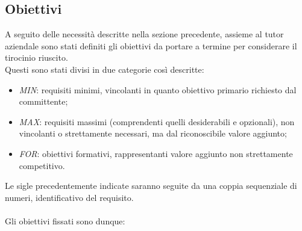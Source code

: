 \subsection{Obiettivi}
\label{subsec:obiettivi}
A seguito delle necessità descritte nella sezione precedente, assieme al tutor aziendale sono stati definiti gli obiettivi da portare a termine per considerare il tirocinio riuscito. \\
Questi sono stati divisi in due categorie così descritte:
\begin{itemize}
	\item \textit{MIN}: requisiti minimi, vincolanti in quanto obiettivo primario richiesto dal committente;
	\item \textit{MAX}: requisiti massimi (comprendenti quelli desiderabili e opzionali), non vincolanti o strettamente necessari, ma dal riconoscibile valore aggiunto;
	\item \textit{FOR}: obiettivi formativi, rappresentanti valore aggiunto non strettamente competitivo.
\end{itemize}
Le sigle precedentemente indicate saranno seguite da una coppia sequenziale di numeri, identificativo del requisito.\\\\
Gli obiettivi fissati sono dunque:
